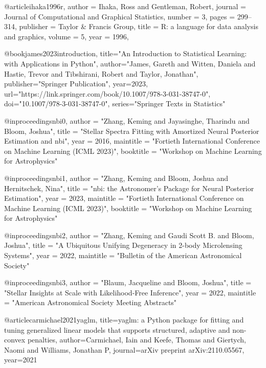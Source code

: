 @article{ihaka1996r,
  author =        {Ihaka, Ross and Gentleman, Robert},
  journal =       {Journal of Computational and Graphical Statistics},
  number =        {3},
  pages =         {299--314},
  publisher =     {Taylor \& Francis Group},
  title =         {R: a language for data analysis and graphics},
  volume =        {5},
  year =          {1996},
}


@book{james2023introduction,
  title="An {I}ntroduction to {S}tatistical {L}earning: with {A}pplications in {P}ython",
  author="James, Gareth and Witten, Daniela and Hastie, Trevor and Tibshirani, Robert and Taylor, Jonathan",
  publisher="Springer Publication",
  year=2023,
  url="https://link.springer.com/book/10.1007/978-3-031-38747-0",
  doi="10.1007/978-3-031-38747-0",
  series="{S}pringer {T}exts in {S}tatistics"
}

@inproceedings{nbi0,
  author    = "Zhang, Keming and Jayasinghe, Tharindu and Bloom, Joshua",
  title     = "Stellar Spectra Fitting with Amortized Neural Posterior Estimation and nbi",
  year      = 2016,
  maintitle = "Fortieth International Conference on Machine Learning (ICML 2023)",
  booktitle = "Workshop on Machine Learning for Astrophysics"
}

@inproceedings{nbi1,
  author    = "Zhang, Keming and Bloom, Joshua and Hernitschek, Nina",
  title     = "nbi: the Astronomer’s Package for Neural Posterior Estimation",
  year      = 2023,
  maintitle = "Fortieth International Conference on Machine Learning (ICML 2023)",
  booktitle = "Workshop on Machine Learning for Astrophysics"
}

@inproceedings{nbi2,
  author    = "Zhang, Keming and Gaudi Scott B. and Bloom, Joshua",
  title     = "A Ubiquitous Unifying Degeneracy in 2-body Microlensing Systems",
  year      = 2022,
  maintitle = "Bulletin of the American Astronomical Society"
}

@inproceedings{nbi3,
  author    = "Blaum, Jacqueline and Bloom, Joshua",
  title     = "Stellar Insights at Scale with Likelihood-Free Inference",
  year      = 2022,
  maintitle = "American Astronomical Society Meeting Abstracts"
}

@article{carmichael2021yaglm,
  title={yaglm: a Python package for fitting and tuning generalized linear models that supports structured, adaptive and non-convex penalties},
  author={Carmichael, Iain and Keefe, Thomas and Giertych, Naomi and Williams, Jonathan P},
  journal={arXiv preprint arXiv:2110.05567},
  year={2021}
}



